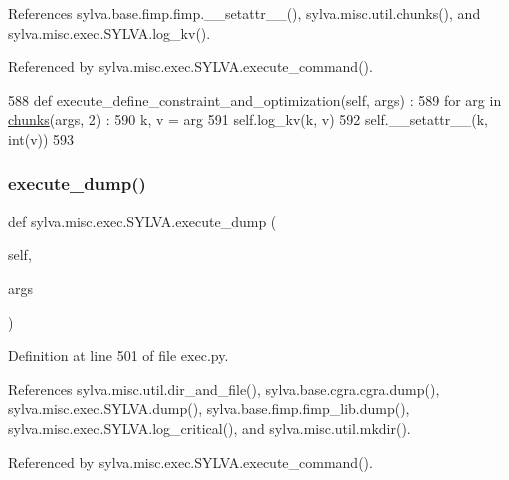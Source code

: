 References sylva.\+base.\+fimp.\+fimp.\+\_\+\+\_\+setattr\+\_\+\+\_\+(), sylva.\+misc.\+util.\+chunks(), and sylva.\+misc.\+exec.\+S\+Y\+L\+V\+A.\+log\+\_\+kv().



Referenced by sylva.\+misc.\+exec.\+S\+Y\+L\+V\+A.\+execute\+\_\+command().


\begin{DoxyCode}
588   \textcolor{keyword}{def }execute\_define\_constraint\_and\_optimization(self, args) :
589     \textcolor{keywordflow}{for} arg \textcolor{keywordflow}{in} \hyperlink{namespacesylva_1_1misc_1_1util_aa202ba520fb5e2daa064c4379aeeb5cf}{chunks}(args, 2) :
590       k, v = arg
591       self.log\_kv(k, v)
592       self.\_\_setattr\_\_(k, int(v))
593 
\end{DoxyCode}
\mbox{\label{classsylva_1_1misc_1_1exec_1_1_s_y_l_v_a_a1e3a1bd5990d4d39571805075e3103ba}} 
\subsubsection{\texorpdfstring{execute\+\_\+dump()}{execute\_dump()}}
{\footnotesize\ttfamily def sylva.\+misc.\+exec.\+S\+Y\+L\+V\+A.\+execute\+\_\+dump (\begin{DoxyParamCaption}\item[{}]{self,  }\item[{}]{args }\end{DoxyParamCaption})}



Definition at line 501 of file exec.\+py.



References sylva.\+misc.\+util.\+dir\+\_\+and\+\_\+file(), sylva.\+base.\+cgra.\+cgra.\+dump(), sylva.\+misc.\+exec.\+S\+Y\+L\+V\+A.\+dump(), sylva.\+base.\+fimp.\+fimp\+\_\+lib.\+dump(), sylva.\+misc.\+exec.\+S\+Y\+L\+V\+A.\+log\+\_\+critical(), and sylva.\+misc.\+util.\+mkdir().



Referenced by sylva.\+misc.\+exec.\+S\+Y\+L\+V\+A.\+execute\+\_\+command().


